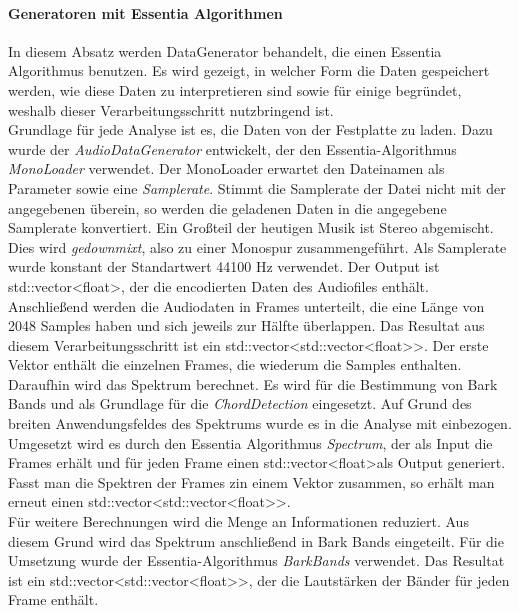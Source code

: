 \documentclass[11pt,a4paper]{article}
\begin{document}
\paragraph{Generatoren mit Essentia Algorithmen}
In diesem Absatz werden DataGenerator behandelt, die einen Essentia Algorithmus benutzen. Es wird gezeigt, in welcher Form die Daten gespeichert werden, wie diese Daten zu interpretieren sind sowie für einige begründet, weshalb dieser Verarbeitungsschritt nutzbringend ist.\\
Grundlage für jede Analyse ist es, die Daten von der Festplatte zu laden. Dazu wurde der \textit{AudioDataGenerator} entwickelt, der den Essentia-Algorithmus \textit{MonoLoader} verwendet. Der MonoLoader erwartet den Dateinamen als Parameter sowie eine \textit{Samplerate}. Stimmt die Samplerate der Datei nicht mit der angegebenen überein, so werden die geladenen Daten in die angegebene Samplerate konvertiert. Ein Großteil der heutigen Musik ist Stereo abgemischt. Dies wird \textit{gedownmixt}, also zu einer Monospur zusammengeführt. Als Samplerate wurde konstant der Standartwert 44100 Hz verwendet. Der Output ist std::vector\textless float\textgreater , der die encodierten Daten des Audiofiles enthält.\\
Anschließend werden die Audiodaten in Frames unterteilt, die eine Länge von 2048 Samples haben und sich jeweils zur Hälfte überlappen. Das Resultat aus diesem Verarbeitungsschritt ist ein std::vector\textless std::vector\textless float\textgreater\text{}\textgreater . Der erste Vektor enthält die einzelnen Frames, die wiederum die Samples enthalten.\\
Daraufhin wird das Spektrum berechnet. Es wird für die Bestimmung von Bark Bands und als Grundlage für die \textit{ChordDetection} eingesetzt. Auf Grund des breiten Anwendungsfeldes des Spektrums wurde es in die Analyse mit einbezogen. Umgesetzt wird es durch den Essentia Algorithmus \textit{Spectrum}, der als Input die Frames erhält und für jeden Frame einen std::vector\textless float\textgreater als Output generiert. Fasst man die Spektren der Frames zin einem Vektor zusammen, so erhält man erneut einen std::vector\textless std::vector\textless float\textgreater\text{}\textgreater .\\
Für weitere Berechnungen wird die Menge an Informationen reduziert. Aus diesem Grund wird das Spektrum anschließend in Bark Bands eingeteilt. Für die Umsetzung wurde der Essentia-Algorithmus \textit{BarkBands} verwendet. Das Resultat ist ein std::vector<std::vector<float>\text{}>, der die Lautstärken der Bänder für jeden Frame enthält.\\
\end{document}
